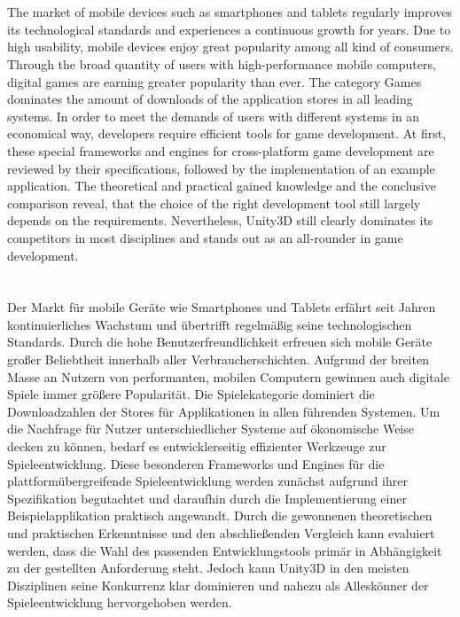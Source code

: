 \section*{\centering\abstractname}
The market of mobile devices such as smartphones and tablets regularly improves its technological standards and experiences a continuous growth for years. Due to high usability, mobile devices enjoy great popularity among all kind of consumers. Through the broad quantity of users with high-performance mobile computers, digital games are earning greater popularity than ever. The category Games dominates the amount of downloads of the application stores in all leading systems. In order to meet the demands of users with different systems in an economical way, developers require efficient tools for game development. At first, these special frameworks and engines for cross-platform game development are reviewed by their specifications, followed by the implementation of an example application. The theoretical and practical gained knowledge and the conclusive comparison reveal, that the choice of the right development tool still largely depends on the requirements. Nevertheless, Unity3D still clearly dominates its competitors in most disciplines and stands out as an all-rounder in game development. 


\section*{\centering\abstractname}
Der Markt für mobile Geräte wie Smartphones und Tablets erfährt seit Jahren kontinuierliches Wachstum und übertrifft regelmäßig seine technologischen Standards. Durch die hohe Benutzerfreundlichkeit erfreuen sich mobile Geräte großer Beliebtheit innerhalb aller Verbraucherschichten. Aufgrund der breiten Masse an Nutzern von performanten, mobilen Computern gewinnen auch digitale Spiele immer größere Popularität. Die Spielekategorie dominiert die Downloadzahlen der Stores für Applikationen in allen führenden Systemen. Um die Nachfrage für Nutzer unterschiedlicher Systeme auf ökonomische Weise decken zu können, bedarf es entwicklerseitig effizienter Werkzeuge zur Spieleentwicklung.
Diese besonderen Frameworks und Engines für die plattformübergreifende Spieleentwicklung werden zunächst aufgrund ihrer Spezifikation begutachtet und daraufhin durch die Implementierung einer Beispielapplikation praktisch angewandt. Durch die gewonnenen theoretischen und praktischen Erkenntnisse und den abschließenden Vergleich kann evaluiert werden, dass die Wahl des passenden Entwicklungstools primär in Abhängigkeit zu der gestellten Anforderung steht. Jedoch kann Unity3D in den meisten Disziplinen seine Konkurrenz klar dominieren und nahezu als Alleskönner der Spieleentwicklung hervorgehoben werden.





